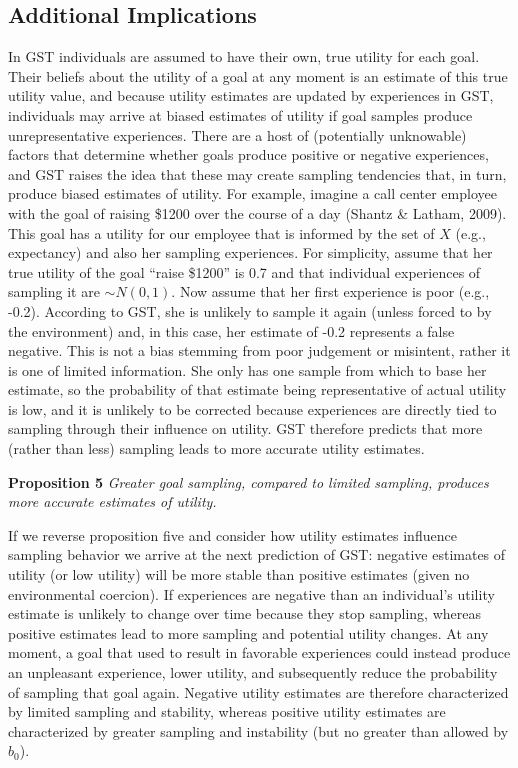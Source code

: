 \documentclass[english,,man]{apa6}
\theoremstyle{definition}
\theoremstyle{definition}
\theoremstyle{definition}
\theoremstyle{remark}
\begin{document}
\hypertarget{additional-implications}{%
\subsection{Additional Implications}\label{additional-implications}}

In GST individuals are assumed to have their own, true utility for each
goal. Their beliefs about the utility of a goal at any moment is an
estimate of this true utility value, and because utility estimates are
updated by experiences in GST, individuals may arrive at biased
estimates of utility if goal samples produce unrepresentative
experiences. There are a host of (potentially unknowable) factors that
determine whether goals produce positive or negative experiences, and
GST raises the idea that these may create sampling tendencies that, in
turn, produce biased estimates of utility. For example, imagine a call
center employee with the goal of raising \$1200 over the course of a day
(Shantz \& Latham, 2009). This goal has a utility for our employee that
is informed by the set of \(X\) (e.g., expectancy) and also her sampling
experiences. For simplicity, assume that her true utility of the goal
\enquote{raise \$1200} is 0.7 and that individual experiences of
sampling it are \(\sim {N}(0,1)\). Now assume that her first experience
is poor (e.g., -0.2). According to GST, she is unlikely to sample it
again (unless forced to by the environment) and, in this case, her
estimate of -0.2 represents a false negative. This is not a bias
stemming from poor judgement or misintent, rather it is one of limited
information. She only has one sample from which to base her estimate, so
the probability of that estimate being representative of actual utility
is low, and it is unlikely to be corrected because experiences are
directly tied to sampling through their influence on utility. GST
therefore predicts that more (rather than less) sampling leads to more
accurate utility estimates.

\textbf{Proposition 5} \emph{Greater goal sampling, compared to limited
sampling, produces more accurate estimates of utility.}

If we reverse proposition five and consider how utility estimates
influence sampling behavior we arrive at the next prediction of GST:
negative estimates of utility (or low utility) will be more stable than
positive estimates (given no environmental coercion). If experiences are
negative than an individual's utility estimate is unlikely to change
over time because they stop sampling, whereas positive estimates lead to
more sampling and potential utility changes. At any moment, a goal that
used to result in favorable experiences could instead produce an
unpleasant experience, lower utility, and subsequently reduce the
probability of sampling that goal again. Negative utility estimates are
therefore characterized by limited sampling and stability, whereas
positive utility estimates are characterized by greater sampling and
instability (but no greater than allowed by \(b_0\)).
\end{document}
